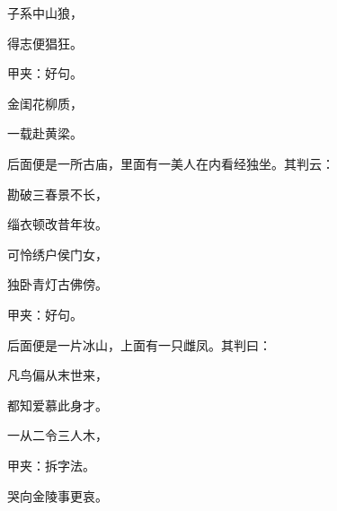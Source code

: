 \begin{poem}
    \begin{pl}子系中山狼，\end{pl}

    \begin{pl}得志便猖狂。\end{pl}\begin{note}甲夹：好句。\end{note}

    \begin{pl}金闺花柳质，\end{pl}

    \begin{pl}一载赴黄梁。\end{pl}

\end{poem}


\begin{parag}
    后面便是一所古庙，里面有一美人在内看经独坐。其判云：
\end{parag}


\begin{poem}
    \begin{pl}勘破三春景不长，\end{pl}

    \begin{pl}缁衣顿改昔年妆。\end{pl}

    \begin{pl}可怜绣户侯门女，\end{pl}

    \begin{pl}独卧青灯古佛傍。\end{pl}

    \begin{note}甲夹：好句。\end{note}
\end{poem}


\begin{parag}
    后面便是一片冰山，上面有一只雌凤。其判曰：
\end{parag}


\begin{poem}
    \begin{pl}凡鸟偏从末世来，\end{pl}

    \begin{pl}都知爱慕此身才。\end{pl}

    \begin{pl}一从二令三人木，\end{pl}\begin{note}甲夹：拆字法。\end{note}

    \begin{pl}哭向金陵事更哀。\end{pl}
\end{poem}


